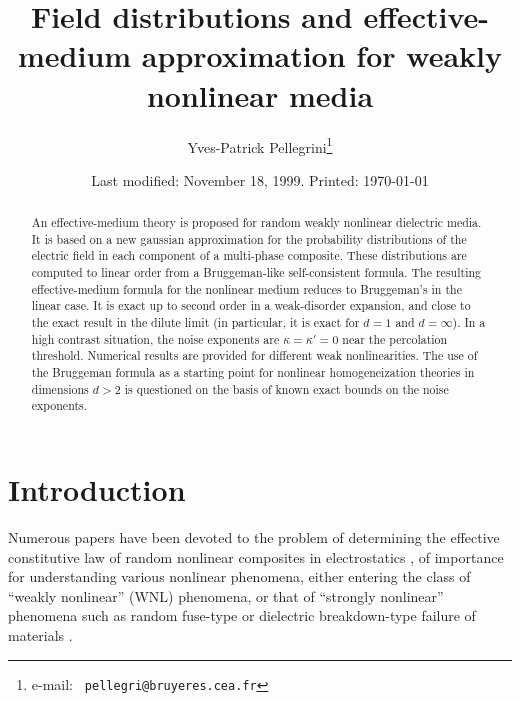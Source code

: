 
\draft
\makeatletter
\title{Field distributions and effective-medium approximation 
for weakly nonlinear media}
\author{Yves-Patrick Pellegrini\thanks{e-mail: {\protect\tt 
 pellegri@bruyeres.cea.fr}}}
\address{ Service de Physique de la Mati\`ere Condens\'ee, \\
		Commissariat \`a l'Energie Atomique,\\
		BP12, 91680 Bruy\`eres-le-Ch\^atel, France.}
\date{Last modified: November 18, 1999. Printed: \today}
\maketitle
\makeatother
\begin{abstract}
An effective-medium theory is proposed for random weakly nonlinear dielectric 
media. It is based on a new gaussian approximation for the probability 
distributions of the electric field in each component of a multi-phase 
composite. These distributions are computed to linear order from a 
Bruggeman-like self-consistent formula. The resulting effective-medium formula 
for the nonlinear medium reduces to Bruggeman's in the linear case. It is exact 
up to second order in a weak-disorder expansion, and close to the exact result 
in the dilute limit (in particular, it is exact for $d=1$ and $d=\infty$). In a 
high contrast situation, the noise exponents are $\kappa=\kappa'=0$ near the 
percolation threshold. Numerical results are provided for different 
weak nonlinearities. The use of the Bruggeman formula as a starting point 
for nonlinear homogeneization theories in dimensions $d>2$ is questioned on 
the basis of known exact bounds on the noise exponents.
\end{abstract}
\bigskip

\makeatother
\section{Introduction}
\label{intro}
Numerous papers have been devoted to the problem of determining the effective 
constitutive law of random nonlinear composites in electrostatics 
\cite{AHAR87,STRO88,ZENG88,BERG89,BLUM89,KOTH90,PONT92,GU92,YU93,YU94,LEE95,GAO96,WAN96,SALI97,PONT97,BART98}, 
of importance for understanding 
various nonlinear phenomena, either entering the class 
of ``weakly nonlinear'' (WNL) phenomena, or that of ``strongly nonlinear'' 
phenomena such as random fuse-type or dielectric breakdown-type failure of 
materials \cite{DUXB86}. 

